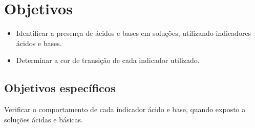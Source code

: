 \section{Objetivos}\label{sec:objetivos}
\begin{itemize}
        \item Identificar a presença de ácidos e bases em soluções, utilizando indicadores ácidos e bases.
        \item Determinar a cor de transição de cada indicador utilizado.
    \end{itemize}
    \subsection{Objetivos específicos}\label{sec:objetivos_especificos}
    \indent Verificar o comportamento de cada indicador ácido e base, quando exposto a soluções ácidas e básicas.